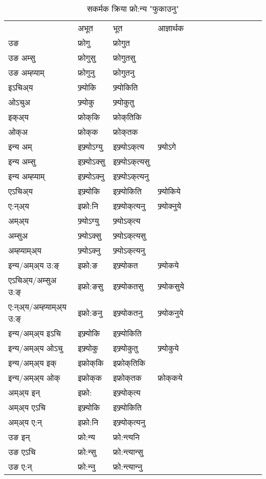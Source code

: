 \begin{table}[H]
\label{ok.vt} \centering
\caption{सकर्मक क्रिया  फ्रो:न्य  "फुकाउनु"  }
\begin{tabular}{l|l|l|l|l|l|l|l|l|l|l|l|l}  \toprule
&अभूत & भूत & आज्ञार्थक \\ 
उङ &फ्रोगु &फ्रोगुत \\ 
उङ अम्सु &फ्रोगुसु &फ्रोगुतसु \\ 
उङ अम्ह्‍याम् &फ्रोगुनु &फ्रोगुतनु \\ 
इऽचिअ्य &फ्र्योकि &फ्र्योकिति   \\ 
ओऽचुअ &फ्र्योकु &फ्र्योकुतु   \\ 
इक्अ्य &फ्रोक्‌कि &फ्रोक्‌तिकि   \\ 
ओक्अ &फ्रोक्‌क &फ्रोक्‌तक   \\ 
इन्य अम् & इफ्र्योऽग्यु  & इफ्र्योऽक्‌त्य &फ्र्योऽगे  \\ 
इन्य अम्सु & इफ्र्योऽक्सु  & इफ्र्योऽक्‌त्यसु   \\ 
इन्य अम्ह्‍याम् & इफ्र्योऽक्‍नु  & इफ्र्योऽक्‌त्यनु   \\ 
एऽचिअ्य & इफ्र्योकि & इफ्र्योकिति &फ्र्योकिये    \\ 
ए:न्अ्य & इफ्रो:नि  & इफ्र्योक्‌त्यनु &फ्र्योक्‍नुये  \\ 
अम्अ्य & फ्र्योऽग्यु  & फ्र्योऽक्‌त्य  \\ 
अम्सुअ & फ्र्योऽक्सु & फ्र्योऽक्‌त्यसु  \\ 
अम्ह्‍याम्अ्य & फ्र्योऽक्‍नु  & फ्र्योऽक्‌त्यनु \\ 
\midrule
इन्य/अम्अ्य उ:ङ्‌&इफ्रो:ङ & इफ्र्योकत &फ्र्योकये \\ 
एऽचिअ्य/अम्सुअ उ:ङ्‌ &इफ्रो:ङसु & इफ्र्योकतसु &फ्र्योकसुये \\ 
ए:न्अ्य/अम्ह्‍याम्अ्य उ:ङ्‌ &इफ्रो:ङनु & इफ्र्योकतनु &फ्र्योकनुये \\ 
इन्य/अम्अ्य इऽचि & इफ्र्योकि & इफ्र्योकिति    \\ 
इन्य/अम्अ्य ओऽचु & इफ्र्योकु & इफ्र्योकुतु  &फ्र्योकुये  \\ 
इन्य/अम्अ्य इक् & इफ्रोक्‌कि & इफ्रोक्‌तिकि   \\ 
इन्य/अम्अ्य ओक् & इफ्रोक्‌क & इफ्रोक्‌तक  &फ्रोक्‌कये  \\ 
अम्अ्य इन् & इफ्रो: & इफ्र्योक्‌त्य   \\ 
अम्अ्य एऽचि & इफ्र्योकि & इफ्र्योकिति    \\ 
अम्अ्य ए:न् & इफ्रो:नि  & इफ्र्योक्‌त्यनु  \\ 
\midrule
उङ इन् & फ्रो:न्य  & फ्रो:न्त्यनि  \\ 
उङ एऽचि & फ्रो:न्सु  & फ्रो:न्त्यान्सु   \\ 
उङ ए:न्& फ्रो:न्‍नु  & फ्रो:न्त्यान्‍नु   \\ 
\bottomrule
\end{tabular}
\end{table}


